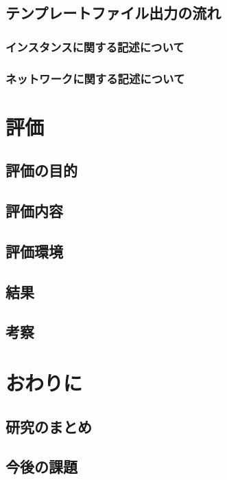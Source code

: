 \documentclass[mingoth]{kut-paper}		%
\begin{document}
	\section{テンプレートファイル出力の流れ}
		\subsection{インスタンスに関する記述について}
		
		\subsection{ネットワークに関する記述について}
		
\chapter{評価}
	\section{評価の目的}
	
	\section{評価内容}
	
	\section{評価環境}
	
	\section{結果}
	
	\section{考察}
	
\chapter{おわりに}
	\section{研究のまとめ}
	\section{今後の課題}
	

\end{document}
